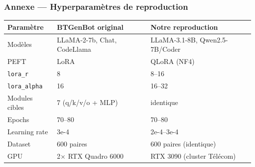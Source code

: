 \documentclass[aspectratio=169]{beamer}
\begin{document}
\appendix

\begin{frame}
  \frametitle{Annexe — Hyperparamètres de reproduction}

  \begin{center}
  {\small\begin{tabular}{lp{3.6cm}p{4.0cm}}
    \toprule
    \textbf{Paramètre} & \textbf{BTGenBot original} & \textbf{Notre reproduction} \\
    \midrule
    Modèles & LLaMA-2-7b, Chat, CodeLlama & LLaMA-3.1-8B, Qwen2.5-7B/Coder \\
    PEFT & LoRA & QLoRA (NF4) \\
    \texttt{lora\_r} & 8 & 8–16 \\
    \texttt{lora\_alpha} & 16 & 16–32 \\
    Modules cibles & 7 (q/k/v/o + MLP) & identique \\
    Epochs & 70–80 & 70–80 \\
    Learning rate & 3e-4 & 2e-4–3e-4 \\
    Dataset & 600 paires & 600 paires (identique) \\
    GPU & 2$\times$ RTX Quadro 6000 & RTX 3090 (cluster Télécom) \\
    \bottomrule
  \end{tabular}}
  \end{center}
\end{frame}

\end{document}
